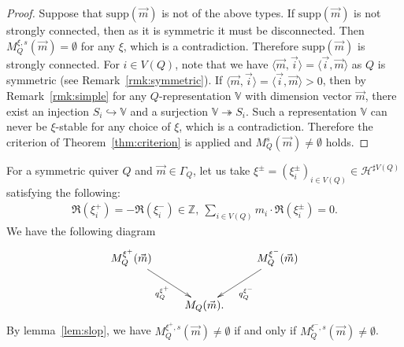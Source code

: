 \documentclass[11pt]{amsart}
\theoremstyle{plain}
\theoremstyle{definition}
\theoremstyle{remark}
\newcommand{\hH}{\mathcal{H}}
\begin{document}
\begin{proof}
Suppose that $\mathrm{supp}(\vec{m})$ is not of the above types. 
If $\mathrm{supp}(\vec{m})$ is not
strongly connected, then as 
it is symmetric it must be disconnected. 
Then $M_Q^{\xi, s}(\vec{m}) =\emptyset$ for any $\xi$, 
which is a contradiction. 
Therefore $\mathrm{supp}(\vec{m})$ is strongly connected. 
For $i \in V(Q)$, 
note that we have $\langle \vec{m}, \vec{i} \rangle= \langle \vec{i}, \vec{m} \rangle$
as $Q$ is symmetric (see Remark~\ref{rmk:symmetric}). 
If $\langle \vec{m}, \vec{i} \rangle=\langle \vec{i}, \vec{m} \rangle>0$, then by 
Remark~\ref{rmk:simple}
for any $Q$-representation 
$\mathbb{V}$ with dimension vector $\vec{m}$,
there exist an injection $S_i \hookrightarrow \mathbb{V}$
and a surjection $\mathbb{V} \twoheadrightarrow S_i$. 
Such a representation $\mathbb{V}$ can never be 
$\xi$-stable for any choice of $\xi$, 
which is a contradiction. 
Therefore the criterion of Theorem~\ref{thm:criterion} is applied
and $M_Q^s(\vec{m}) \neq \emptyset$ holds. 
\end{proof}

For a symmetric quiver $Q$ and $\vec{m} \in \Gamma_Q$, let us take
$\xi^{\pm}=(\xi_i^{\pm})_{i \in V(Q)} \in \hH^{\sharp V(Q)}$
satisfying the following: 
\begin{align}\label{satisfy:xi}
\Re (\xi^+_i)=-\Re (\xi^-_i)  \in \mathbb{Z}, \ 
\sum_{i \in V(Q)} m_i \cdot \Re (\xi^{\pm}_i)=0.
\end{align}
We have the following diagram
\begin{align}\label{dia:sflop}
\xymatrix{
M_{Q}^{\xi^{+}}(\vec{m}) \ar[rd]_-{q_{Q}^{\xi^{+}}}
 & & M_Q^{\xi^{-}}(\vec{m}) \ar[ld]^-{q_{Q}^{\xi^{-}}} \\
& M_Q(\vec{m}). &
} 
\end{align}
By lemma~\ref{lem:slop}, 
we have $M_Q^{\xi^{+}, s}(\vec{m}) \neq \emptyset$ if
and only if 
$M_Q^{\xi^{-}, s}(\vec{m}) \neq \emptyset$. 
\end{document}
